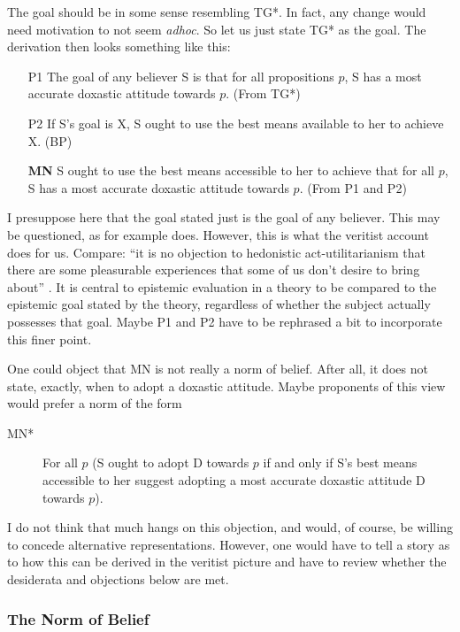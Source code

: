\documentclass[12pt,numbers=noenddot]{scrartcl}
\begin{document}
The goal should be in some sense resembling TG*. In fact, any change would need motivation to not seem \emph{adhoc}. So let us just state TG* as the goal. The derivation then looks something like this:

\begin{enumerate}
    \item[P1] The goal of any believer S is that for all propositions $p$, S has a most accurate doxastic attitude towards $p$. (From TG*)
    \item[P2] If S's goal is X, S ought to use the best means available to her to achieve X. (BP)
    \item[\textbf{MN}] S ought to use the best means accessible to her to achieve that for all $p$, S has a most accurate doxastic attitude towards $p$. (From P1 and P2)
\end{enumerate}

I presuppose here that the goal stated just is the goal of any believer. This may be questioned, as for example \textcite{Kelly2003-KELERA} does. However, this is what the veritist account does for us. Compare: “it is no objection to hedonistic act-utilitarianism that there are some pleasurable experiences that some of us don’t desire to bring about” \autocite[362]{Berker2013-BERETA-2}. It is central to epistemic evaluation in a theory to be compared to the epistemic goal stated by the theory, regardless of whether the subject actually possesses that goal. Maybe P1 and P2 have to be rephrased a bit to incorporate this finer point.

One could object that MN is not really a norm of belief. After all, it does not state, exactly, when to adopt a doxastic attitude. Maybe proponents of this view would prefer a norm of the form
\begin{description}
    \item[MN*] For all $p$ (S ought to adopt D towards $p$ if and only if S's best means accessible to her suggest adopting a most accurate doxastic attitude D towards $p$).
\end{description}
I do not think that much hangs on this objection, and would, of course, be willing to concede alternative representations. However, one would have to tell a story as to how this can be derived in the veritist picture and have to review whether the desiderata and objections below are met.

\subsubsection{The Norm of Belief}
\end{document}
